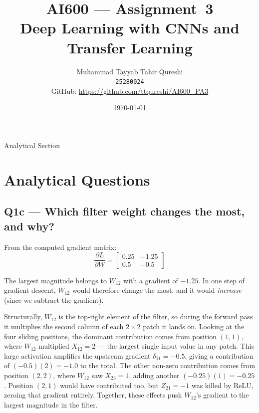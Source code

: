\documentclass[11pt,a4paper]{article}
\title{AI600 --- Assignment~3\\Deep Learning with CNNs and Transfer Learning}
\author{Muhammad Tayyab Tahir Qureshi\\
\texttt{25280024}\\[4pt]
GitHub: \url{https://github.com/ttqureshi/AI600_PA3}}
\date{\today}
\begin{document}
\maketitle
\vspace*{\fill}

\newpage

\vspace*{\fill}
\begin{center}
    \Huge{Analytical Section}
\end{center}
\vspace*{\fill}
\newpage
\section{Analytical Questions}

\subsection{Q1c --- Which filter weight changes the most, and why?}

From the computed gradient matrix:
\[
\frac{\partial L}{\partial W} = \begin{bmatrix} 0.25 & -1.25 \\ 0.5 & -0.5 \end{bmatrix}
\]

The largest magnitude belongs to $W_{12}$ with a gradient of $-1.25$. In one
step of gradient descent, $W_{12}$ would therefore change the most, and it
would \emph{increase} (since we subtract the gradient).

Structurally, $W_{12}$ is the top-right element of the filter, so during the
forward pass it multiplies the second column of each $2\times2$ patch it lands
on. Looking at the four sliding positions, the dominant contribution comes from
position $(1,1)$, where $W_{12}$ multiplied $X_{12} = 2$ --- the largest
single input value in any patch. This large activation amplifies the upstream
gradient $\delta_{11} = -0.5$, giving a contribution of $(-0.5)(2) = -1.0$
to the total. The other non-zero contribution comes from position $(2,2)$,
where $W_{12}$ saw $X_{23} = 1$, adding another $(-0.25)(1) = -0.25$.
Position $(2,1)$ would have contributed too, but $Z_{21} = -1$ was killed by
ReLU, zeroing that gradient entirely. Together, these effects push $W_{12}$'s
gradient to the largest magnitude in the filter.
\end{document}
